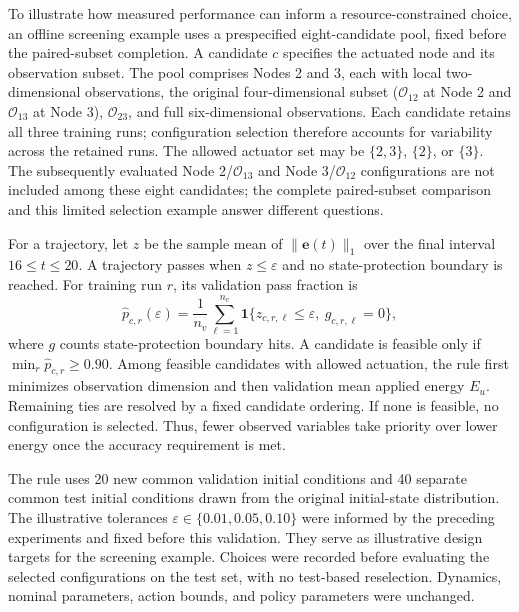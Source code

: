 To illustrate how measured performance can inform a resource-constrained choice, an offline screening example uses a prespecified eight-candidate pool, fixed before the paired-subset completion. A candidate $c$ specifies the actuated node and its observation subset. The pool comprises Nodes 2 and 3, each with local two-dimensional observations, the original four-dimensional subset ($\mathcal O_{12}$ at Node 2 and $\mathcal O_{13}$ at Node 3), $\mathcal O_{23}$, and full six-dimensional observations. Each candidate retains all three training runs; configuration selection therefore accounts for variability across the retained runs. The allowed actuator set may be $\{2,3\}$, $\{2\}$, or $\{3\}$. The subsequently evaluated Node 2/$\mathcal O_{13}$ and Node 3/$\mathcal O_{12}$ configurations are not included among these eight candidates; the complete paired-subset comparison and this limited selection example answer different questions.

For a trajectory, let $z$ be the sample mean of $\|\mathbf e(t)\|_1$ over the final interval $16\leq t\leq20$. A trajectory passes when $z\leq\varepsilon$ and no state-protection boundary is reached. For training run $r$, its validation pass fraction is
\begin{equation}
 \widehat p_{c,r}(\varepsilon)
 =\frac{1}{n_v}\sum_{\ell=1}^{n_v}
 \mathbf 1\{z_{c,r,\ell}\leq\varepsilon,\ g_{c,r,\ell}=0\},
 \label{eq:configuration_pass}
\end{equation}
where $g$ counts state-protection boundary hits. A candidate is feasible only if $\min_r\widehat p_{c,r}\geq0.90$. Among feasible candidates with allowed actuation, the rule first minimizes observation dimension and then validation mean applied energy $E_u$. Remaining ties are resolved by a fixed candidate ordering. If none is feasible, no configuration is selected. Thus, fewer observed variables take priority over lower energy once the accuracy requirement is met.

The rule uses 20 new common validation initial conditions and 40 separate common test initial conditions drawn from the original initial-state distribution. The illustrative tolerances $\varepsilon\in\{0.01,0.05,0.10\}$ were informed by the preceding experiments and fixed before this validation. They serve as illustrative design targets for the screening example. Choices were recorded before evaluating the selected configurations on the test set, with no test-based reselection. Dynamics, nominal parameters, action bounds, and policy parameters were unchanged.

